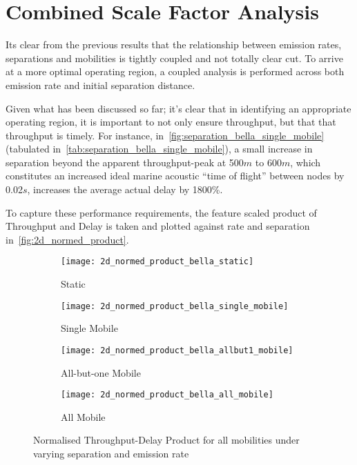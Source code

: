 \clearpage

\section{Combined Scale Factor Analysis}

Its clear from the previous results that the relationship between emission rates, separations and mobilities is tightly coupled and not totally clear cut. 
To arrive at a more optimal operating region, a coupled analysis is performed across both emission rate and initial separation distance.

Given what has been discussed so far; it's clear that in identifying an appropriate operating region, it is important to not only ensure throughput, but that that throughput is timely.
For instance, in~\autoref{fig:separation_bella_single_mobile} (tabulated in~\autoref{tab:separation_bella_single_mobile}), a small increase in separation beyond the apparent throughput-peak at 500$m$ to 600$m$, which constitutes an increased ideal marine acoustic ``time of flight'' between nodes by 0.02$s$, increases the average actual delay by 1800\%. 

To capture these performance requirements, the feature scaled product of Throughput and Delay is taken and plotted against rate and separation in~\autoref{fig:2d_normed_product}.



\begin{figure}[h]
  \begin{subfigure}[t]{0.5\textwidth}
    \centering
    \texttt{[image: 2d\_normed\_product\_bella\_static]}
    \caption{Static}
    \label{fig:2d_normed_product_bella_static}
  \end{subfigure}
  \begin{subfigure}[t]{0.5\textwidth}
    \centering
    \texttt{[image: 2d\_normed\_product\_bella\_single\_mobile]}
    \caption{Single Mobile}
    \label{fig:2d_normed_product_bella_single_mobile}
  \end{subfigure}
  
  \begin{subfigure}[t]{0.5\textwidth}
    \centering
    \texttt{[image: 2d\_normed\_product\_bella\_allbut1\_mobile]}
    \caption{All-but-one Mobile}
    \label{fig:2d_normed_product_bella_allbut1_mobile}
  \end{subfigure}
  \begin{subfigure}[t]{0.5\textwidth}
    \centering
    \texttt{[image: 2d\_normed\_product\_bella\_all\_mobile]}
    \caption{All Mobile}
    \label{fig:2d_normed_product_bella_all_mobile}
  \end{subfigure}
  \caption{Normalised Throughput-Delay Product for all mobilities under varying separation and emission rate}
  \label{fig:2d_normed_product}
\end{figure}


